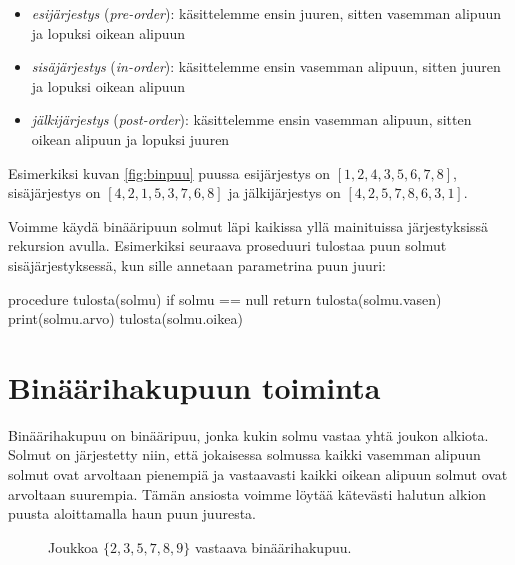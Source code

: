 \begin{itemize}
\item \emph{esijärjestys} (\emph{pre-order}): käsittelemme ensin juuren, sitten vasemman alipuun
ja lopuksi oikean alipuun
\item \emph{sisäjärjestys} (\emph{in-order}): käsittelemme ensin vasemman alipuun, sitten juuren
ja lopuksi oikean alipuun
\item \emph{jälkijärjestys} (\emph{post-order}): käsittelemme ensin vasemman alipuun,
sitten oikean alipuun ja lopuksi juuren
\end{itemize}

Esimerkiksi kuvan \ref{fig:binpuu} puussa
esijärjestys on $[1,2,4,3,5,6,7,8]$,
sisäjärjes\-tys on $[4,2,1,5,3,7,6,8]$ ja
jälkijärjestys on $[4,2,5,7,8,6,3,1]$.

Voimme käydä binääripuun solmut läpi kaikissa yllä mainituissa
järjes\-tyksissä rekursion avulla.
Esimerkiksi seuraava proseduuri tulostaa puun solmut
sisäjärjestyksessä, kun sille annetaan parametrina
puun juuri:

\begin{code}
procedure tulosta(solmu)
    if solmu == null
        return
    tulosta(solmu.vasen)
    print(solmu.arvo)
    tulosta(solmu.oikea)
\end{code}

\section{Binäärihakupuun toiminta}

Binäärihakupuu on binääripuu, jonka kukin solmu
vastaa yhtä joukon alkiota.
Solmut on järjestetty niin, että jokaisessa solmussa
kaikki vasemman alipuun solmut ovat arvoltaan pienempiä
ja vastaavasti kaikki oikean alipuun solmut
ovat arvoltaan suurempia.
Tämän ansiosta voimme löytää kätevästi halutun
alkion puusta aloittamalla haun puun juuresta.

\begin{figure}
\center
{}
\caption{Joukkoa $\{2,3,5,7,8,9\}$ vastaava binäärihakupuu.}
\label{fig:bihpuu}
\end{figure}

